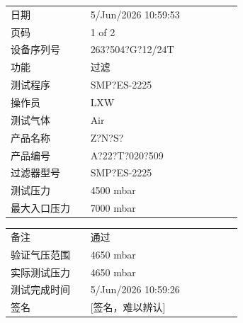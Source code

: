 \documentclass[UTF8,10pt,a4paper,fontset=fandol]{ctexart}
\newcommand{\fieldvalue}[1]{#1}
\newcommand{\handwritten}[1]{#1}
\begin{document}
\begin{tabular}{@{}p{0.30\linewidth}p{0.58\linewidth}@{}}
日期 &
\fieldvalue{5/Jun/2026 10:59:53}
\\
页码 &
\fieldvalue{1 of 2}
\\
设备序列号 &
\fieldvalue{263?504?G?12/24T}
\\
功能 &
\fieldvalue{过滤}
\\
测试程序 &
\fieldvalue{SMP?ES-2225}
\\
操作员 &
\fieldvalue{LXW}
\\
测试气体 &
\fieldvalue{Air}
\\
产品名称 &
\fieldvalue{Z?N?S?}
\\
产品编号 &
\fieldvalue{A?22?T?020?509}
\\
过滤器型号 &
\fieldvalue{SMP?ES-2225}
\\
测试压力 &
\fieldvalue{4500 mbar}
\\
最大入口压力 &
\fieldvalue{7000 mbar}
\end{tabular}

\vspace{1em}

\begin{tabular}{@{}p{0.30\linewidth}p{0.58\linewidth}@{}}
备注 &
\fieldvalue{通过}
\\
验证气压范围 &
\fieldvalue{4650 mbar}
\\
实际测试压力 &
\fieldvalue{4650 mbar}
\\
测试完成时间 &
\fieldvalue{5/Jun/2026 10:59:26}
\\
签名 &
\fieldvalue{\handwritten{[签名，难以辨认]}}
\end{tabular}
\end{document}
